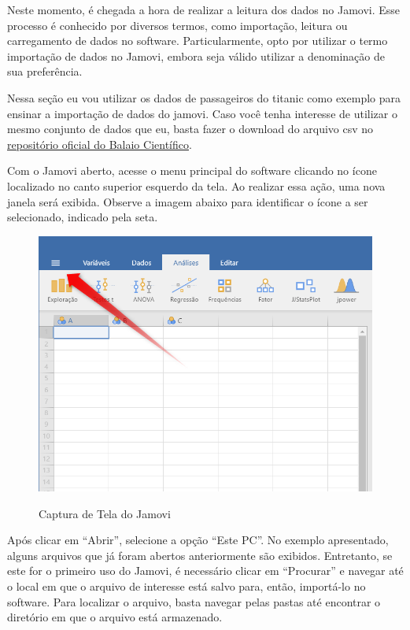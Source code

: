 Neste momento, é chegada a hora de realizar a leitura dos dados no Jamovi. Esse processo é conhecido por diversos termos, como importação, leitura ou carregamento de dados no software. Particularmente, opto por utilizar o termo importação de dados no Jamovi, embora seja válido utilizar a denominação de sua preferência.

Nessa seção eu vou utilizar os dados de passageiros do titanic como exemplo para ensinar a importação de dados do jamovi. Caso você tenha interesse de utilizar o mesmo conjunto de dados que eu, basta fazer o download do arquivo csv no \href{https://github.com/balaio-cientifico/dataset}{repositório oficial do Balaio Científico}.

Com o Jamovi aberto, acesse o menu principal do software clicando no ícone localizado no canto superior esquerdo da tela. Ao realizar essa ação, uma nova janela será exibida. Observe a imagem abaixo para identificar o ícone a ser selecionado, indicado pela seta.

\begin{figure}[H]
  \centering
  \caption{Captura de Tela do Jamovi}
  \includegraphics[width=\textwidth]{imagens/cap_1/importa_dados_1.png}
  \label{fig:importa_dados_1}
\end{figure}

Após clicar em “Abrir”, selecione a opção “Este PC”. No exemplo apresentado, alguns arquivos que já foram abertos anteriormente são exibidos. Entretanto, se este for o primeiro uso do Jamovi, é necessário clicar em “Procurar” e navegar até o local em que o arquivo de interesse está salvo para, então, importá-lo no software. Para localizar o arquivo, basta navegar pelas pastas até encontrar o diretório em que o arquivo está armazenado.

